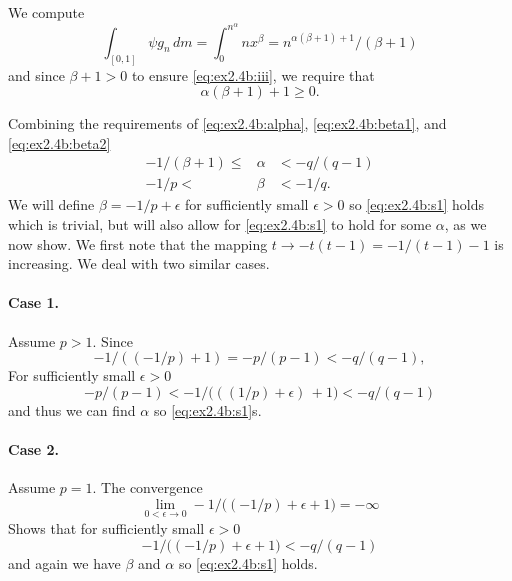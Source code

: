 \documentclass[11pt,twoside,a4paper]{book}
\begin{document}
  We compute
  \begin{equation*}
   \int_{[0,1]} \psi g_n\,dm 
   = \int_0^{n^\alpha} n x^\beta = n^{\alpha(\beta+1) + 1} / (\beta+1)
  \end{equation*}
   and since \(\beta+1 > 0\)
   to ensure \eqref{eq:ex2.4b:iii},  we require that 
   \begin{equation}  \label{eq:ex2.4b:beta2}
     \alpha(\beta+1) + 1 \geq 0.
   \end{equation}

   Combining the requirements of 
   \eqref{eq:ex2.4b:alpha}, 
   \eqref{eq:ex2.4b:beta1}, and 
   \eqref{eq:ex2.4b:beta2}
   \begin{eqnarray} 
     -1/(\beta + 1) \leq &\alpha& < -q/(q-1) \label{eq:ex2.4b:s1} \\
           -1/p     <    &\beta& < -1/q .    \label{eq:ex2.4b:s2}
   \end{eqnarray}
   We will define \(\beta = -1/p + \epsilon\) 
   for sufficiently small \(\epsilon > 0\) 
   so \eqref{eq:ex2.4b:s1} holds which is trivial,
   but will also allow for \eqref{eq:ex2.4b:s1} to hold for some \(\alpha\),
   as we now show.
   We first note that the mapping
   \(t \to -t(t-1) = -1/(t-1) -1\) is increasing.
   We deal with two similar cases.
   \paragraph{Case 1.} Assume \(p>1\). 
   Since
   \begin{equation*}
     -1/((-1/p) + 1) = -p/(p-1) < -q/(q-1),
   \end{equation*}
   For sufficiently small \(\epsilon>0\) 
   \begin{equation*}
     -p/(p-1) <  -1\big/\bigl(((1/p)+\epsilon)\, + 1\bigr) < -q/(q-1)
   \end{equation*}
   and thus we can find \(\alpha\) so \eqref{eq:ex2.4b:s1}s.
   \paragraph{Case 2.} Assume \(p=1\). The convergence
   \begin{equation*}
   \lim_{0<\epsilon\to 0} -1\big/\bigl((-1/p)+\epsilon + 1\bigr) = -\infty
   \end{equation*}
   Shows that for sufficiently small \(\epsilon > 0\)
   \begin{equation*}
      -1\big/\bigl((-1/p)+\epsilon + 1\bigr) < -q/(q-1)
   \end{equation*}
   and again we have \(\beta\) and \(\alpha\) so \eqref{eq:ex2.4b:s1} holds.
\end{document}
